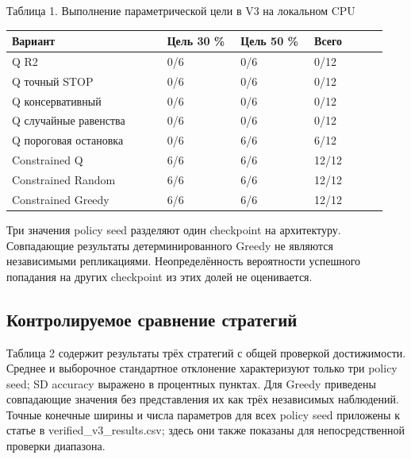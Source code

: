 \documentclass[10pt,a4paper]{article}
\begin{document}
\par\medskip\noindent Таблица 1. Выполнение параметрической цели в V3 на локальном CPU\par
\begingroup\setlength{\tabcolsep}{2pt}\renewcommand{\arraystretch}{1.12}
\begin{longtable}{p{0.387\linewidth}p{0.182\linewidth}p{0.182\linewidth}p{0.188\linewidth}}
\toprule
Вариант & Цель 30 \% & Цель 50 \% & Всего\\ \midrule\endhead
Q R2 & 0/6 & 0/6 & 0/12\\
Q точный STOP & 0/6 & 0/6 & 0/12\\
Q консервативный & 0/6 & 0/6 & 0/12\\
Q случайные равенства & 0/6 & 0/6 & 0/12\\
Q пороговая остановка & 0/6 & 6/6 & 6/12\\
Constrained Q & 6/6 & 6/6 & 12/12\\
Constrained Random & 6/6 & 6/6 & 12/12\\
Constrained Greedy & 6/6 & 6/6 & 12/12\\
\bottomrule\end{longtable}\endgroup
Три значения policy seed разделяют один checkpoint на архитектуру. Совпадающие результаты детерминированного Greedy не являются независимыми репликациями. Неопределённость вероятности успешного попадания на других checkpoint из этих долей не оценивается.

\subsection*{Контролируемое сравнение стратегий}
Таблица 2 содержит результаты трёх стратегий с общей проверкой достижимости. Среднее и выборочное стандартное отклонение характеризуют только три policy seed; SD accuracy выражено в процентных пунктах. Для Greedy приведены совпадающие значения без представления их как трёх независимых наблюдений. Точные конечные ширины и числа параметров для всех policy seed приложены к статье в verified\_v3\_results.csv; здесь они также показаны для непосредственной проверки диапазона.
\end{document}
